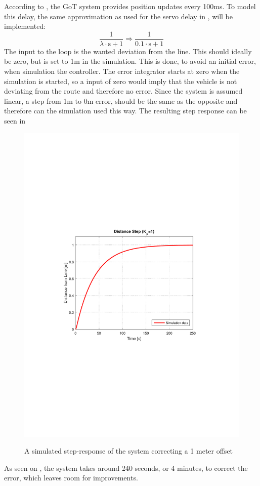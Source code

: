 According to , the GoT system provides position updates every 100ms. To model this delay, the same approximation as used for the servo delay in , will be implemented:
$$\frac{1}{\lambda\cdot\text{s}+1}\Rightarrow\frac{1}{\SI{0,1}\cdot\text{s}+1}
$$
The input to the loop is the wanted deviation from the line. This should ideally be zero, but is set to 1m in the simulation. This is done, to avoid an initial error, when simulation the controller. The error integrator starts at zero when the simulation is started, so a input of zero would imply that the vehicle is not deviating from the route and therefore no error. Since the system is assumed linear, a step from 1m to 0m error, should be the same as the opposite and therefore can the simulation used this way. The resulting step response can be seen in 

\begin{figure}[H]
  \centering
  {
    \includegraphics[width=1.4\textwidth]{figures/distanceStep1.pdf}
  }
  \caption{A simulated step-response of the system correcting a 1 meter offset}
  \label{SimulationSteeringP1}
\end{figure}
As seen on , the system takes around 240 seconds, or 4 minutes, to correct the error, which leaves room for improvements.

